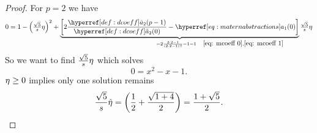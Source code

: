 \begin{proof}
	For \(p=2\) we have
	\begin{equation*}
		0 = 1 - \left(\tfrac{\sqrt{5}}{s}\lr\right)^2
		+ \underbrace{\biggl[2\frac{\dcoeff[2](p-1)}{\dcoeff[2](0)} - \mcoeff[1](0)\biggr]}_{
			= 2\frac{2\cdot 2-1}{(2\cdot 2 -1)!!} - 1
			=1\quad \mathrlap{\eqref{eq: mcoeff 0}, \eqref{eq: mcoeff 1}}
		}\tfrac{\sqrt{5}}{s}\lr
	\end{equation*}
	So we want to find \(\tfrac{\sqrt{5}}{s}\eta\) which solves
	\begin{equation*}
		0 = x^2 - x - 1.
	\end{equation*}
	\(\eta\ge0\) implies only one solution remains
	\begin{equation*}
		\frac{\sqrt{5}}{s}\hat{\eta}
		= \left(\frac12 + \frac{\sqrt{1 + 4}}{2}\right)
		= \frac{1+\sqrt{5}}2.
		\qedhere
	\end{equation*}
\end{proof}



